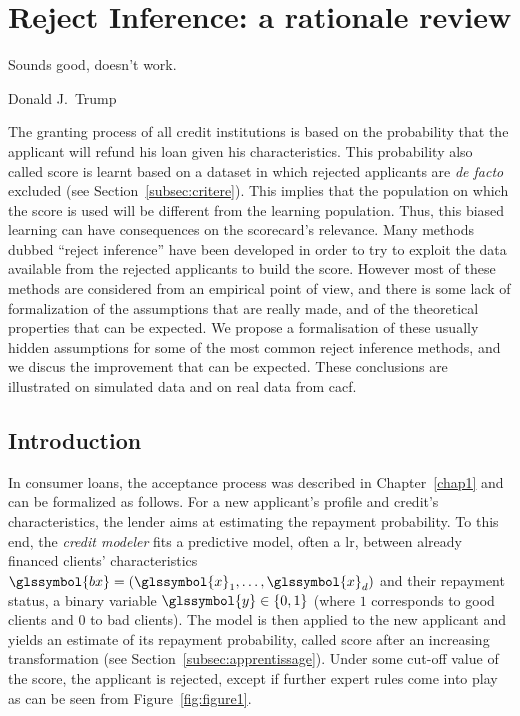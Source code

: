 
\chapter{Reject Inference: a rationale review} \label{chap2}

\epigraph{Sounds good, doesn't work.}{Donald J.\ Trump}

\minitoc


\bigskip

The granting process of all credit institutions is based on the probability that the applicant will refund his loan given his characteristics. This probability also called \gls{score} is learnt based on a dataset in which rejected applicants are \textit{de facto} excluded (see Section~\ref{subsec:critere}). This implies that the population on which the \gls{score} is used will be different from the learning population. Thus, this biased learning can have consequences on the scorecard's relevance. Many methods dubbed ``reject inference'' have been developed in order to try to exploit the data available from the rejected applicants to build the score. However most of these methods are considered from an empirical point of view, and there is some lack of formalization of the assumptions that are really made, and of the theoretical properties that can be expected. We propose a formalisation of these usually hidden assumptions for some of the most common reject inference methods, and we discus the improvement that can be expected. These conclusions are illustrated on simulated data and on real data from \gls{cacf}.

\section{Introduction}

In consumer loans, the acceptance process was described in Chapter~\ref{chap1} and can be formalized as follows. For a new applicant's profile and credit's characteristics, the lender aims at estimating the repayment probability. To this end, the \textit{credit modeler} fits a predictive model, often a \gls{lr}, between already  financed  clients' characteristics $\glssymbol{bx}=(\glssymbol{x}_1,\ldots,\glssymbol{x}_d)$ and their repayment status, a binary variable $\glssymbol{y}\in\{0,1\}$ (where $1$ corresponds to good clients and $0$ to bad clients). The model is then applied to the new applicant and yields an estimate of its repayment probability, called \gls{score} after an increasing transformation (see Section~\ref{subsec:apprentissage}).
Under some cut-off value of the \gls{score}, the applicant is rejected, except if further expert rules come into play as can be seen from Figure~\ref{fig:figure1}.

